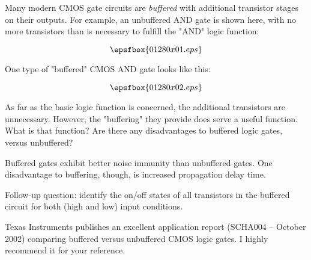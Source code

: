 

Many modern CMOS gate circuits are {\it buffered} with additional transistor stages on their outputs.  For example, an unbuffered AND gate is shown here, with no more transistors than is necessary to fulfill the "AND" logic function:

$$\epsfbox{01280x01.eps}$$

One type of "buffered" CMOS AND gate looks like this:

$$\epsfbox{01280x02.eps}$$

As far as the basic logic function is concerned, the additional transistors are unnecessary.  However, the "buffering" they provide does serve a useful function.  What is that function?  Are there any disadvantages to buffered logic gates, versus unbuffered?







Buffered gates exhibit better noise immunity than unbuffered gates.  One disadvantage to buffering, though, is increased propagation delay time.

\vskip 10pt

Follow-up question: identify the on/off states of all transistors in the buffered circuit for both (high and low) input conditions.







Texas Instruments publishes an excellent application report (SCHA004 -- October 2002) comparing buffered versus unbuffered CMOS logic gates.  I highly recommend it for your reference.




